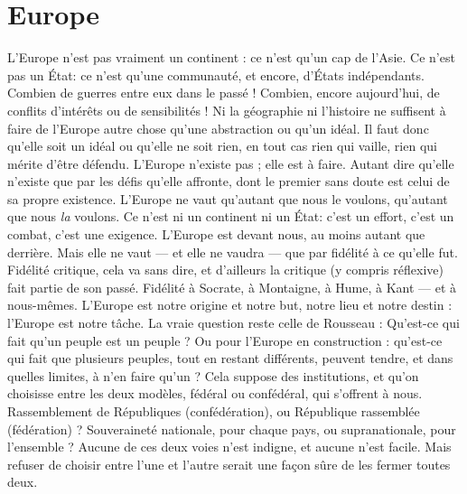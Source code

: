 \section{Europe}
L'Europe n’est pas vraiment un continent : ce n’est qu’un cap de
l'Asie. Ce n’est pas un État: ce n’est qu’une communauté, et
encore, d’États indépendants. Combien de guerres entre eux dans le passé !
Combien, encore aujourd’hui, de conflits d’intérêts ou de sensibilités ! Ni la
géographie ni l’histoire ne suffisent à faire de l’Europe autre chose qu’une abstraction
ou qu’un idéal. Il faut donc qu’elle soit un idéal ou qu’elle ne soit rien,
en tout cas rien qui vaille, rien qui mérite d’être défendu. L'Europe n'existe
pas ; elle est à faire. Autant dire qu’elle n’existe que par les défis qu’elle affronte,
dont le premier sans doute est celui de sa propre existence. L'Europe ne vaut
qu’autant que nous le voulons, qu’autant que nous {\it la} voulons. Ce n’est ni un
continent ni un État: c’est un effort, c’est un combat, c’est une exigence.
L'Europe est devant nous, au moins autant que derrière. Mais elle ne vaut — et
elle ne vaudra — que par fidélité à ce qu’elle fut. Fidélité critique, cela va sans
dire, et d’ailleurs la critique (y compris réflexive) fait partie de son passé. Fidélité
à Socrate, à Montaigne, à Hume, à Kant — et à nous-mêmes. L'Europe est
notre origine et notre but, notre lieu et notre destin : l’Europe est notre tâche.
La vraie question reste celle de Rousseau : Qu'est-ce qui fait qu’un peuple
est un peuple ? Ou pour l’Europe en construction : qu'est-ce qui fait que plusieurs
peuples, tout en restant différents, peuvent tendre, et dans quelles
limites, à n’en faire qu’un ? Cela suppose des institutions, et qu’on choisisse
entre les deux modèles, fédéral ou confédéral, qui s’offrent à nous. Rassemblement
de Républiques (confédération), ou République rassemblée (fédération) ?
Souveraineté nationale, pour chaque pays, ou supranationale, pour l’ensemble ?
Aucune de ces deux voies n’est indigne, et aucune n’est facile. Mais refuser de
choisir entre l’une et l’autre serait une façon sûre de les fermer toutes deux.

